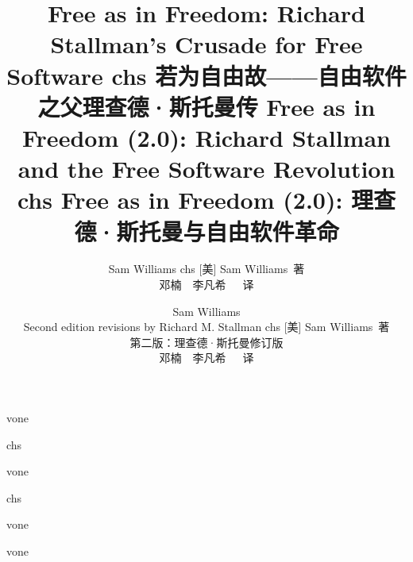 \documentclass[UTF8, a5paper, 10pt]{book}
\def\chs{chs}
\def\vone{vone}
\begin{document}
\ifdefined\vone
\title{\ifdefined\eng
Free as in Freedom: Richard Stallman's Crusade for Free Software
\fi
\ifdefined\chs
若为自由故——自由软件之父理查德·斯托曼传
\fi
}
\author{\ifdefined\eng
Sam Williams
\fi
\ifdefined\chs
[美] Sam Williams\ 著\\
\bigskip
邓楠\ \ 李凡希\ \ \ 译
\fi}
\fi
\ifdefined\vtwo
\title{\ifdefined\eng
Free as in Freedom (2.0): Richard Stallman and the Free Software Revolution
\fi
\ifdefined\chs
Free as in Freedom (2.0): 理查德·斯托曼与自由软件革命
\fi
}
\author{\ifdefined\eng
Sam Williams \\ Second edition revisions by Richard M. Stallman
\fi
\ifdefined\chs
[美] Sam Williams\ 著\\ 第二版：理查德·斯托曼修订版 \\
\bigskip
邓楠\ \ 李凡希\ \ \ 译
\fi}
\fi
\date{}

\maketitle
\thispagestyle{empty}
\frontmatter
\ifdefined\vtwo

\fi
\thispagestyle{empty}
\ifdefined\chs
\renewcommand\contentsname{\textbf{目录}}
\fi
\tableofcontents
\ifdefined\vtwo


\fi
\ifdefined\vone

\ifdefined\chs

\fi
\fi
\mainmatter













\ifdefined\vone

\fi
\backmatter
\ifdefined\vtwo

\fi
\ifdefined\vone

\fi


\printindex
\ifdefined\vtwo

\fi
\end{document}
